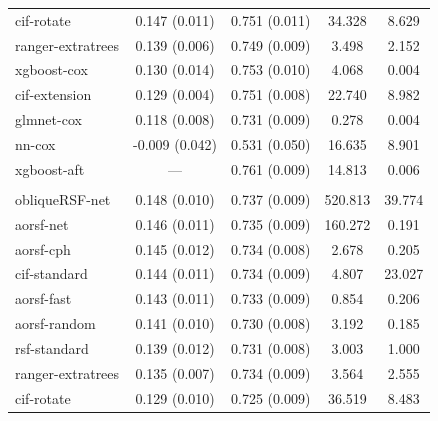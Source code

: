 \documentclass{article}\usepackage[]{graphicx}\usepackage[]{xcolor}
\newenvironment{knitrout}{}{} %
\begin{document}
\begin{knitrout}
\begin{longtable}[t]{lcccc}
\hspace{1em}cif-rotate & 0.147 (0.011) & 0.751 (0.011) & 34.328 & 8.629\\
\hspace{1em}ranger-extratrees & 0.139 (0.006) & 0.749 (0.009) & 3.498 & 2.152\\
\hspace{1em}xgboost-cox & 0.130 (0.014) & 0.753 (0.010) & 4.068 & 0.004\\
\hspace{1em}cif-extension & 0.129 (0.004) & 0.751 (0.008) & 22.740 & 8.982\\
\hspace{1em}glmnet-cox & 0.118 (0.008) & 0.731 (0.009) & 0.278 & 0.004\\
\hspace{1em}nn-cox & -0.009 (0.042) & 0.531 (0.050) & 16.635 & 8.901\\
\hspace{1em}xgboost-aft & --- & 0.761 (0.009) & 14.813 & 0.006\\
\addlinespace[0.3em]
\multicolumn{5}{l}{\textit{\textbf{Rotterdam tumor bank; recurrence, n = 2982, p = 11}}}\\
\hline
\hspace{1em}obliqueRSF-net & 0.148 (0.010) & 0.737 (0.009) & 520.813 & 39.774\\
\hspace{1em}aorsf-net & 0.146 (0.011) & 0.735 (0.009) & 160.272 & 0.191\\
\hspace{1em}aorsf-cph & 0.145 (0.012) & 0.734 (0.008) & 2.678 & 0.205\\
\hspace{1em}cif-standard & 0.144 (0.011) & 0.734 (0.009) & 4.807 & 23.027\\
\hspace{1em}aorsf-fast & 0.143 (0.011) & 0.733 (0.009) & 0.854 & 0.206\\
\hspace{1em}aorsf-random & 0.141 (0.010) & 0.730 (0.008) & 3.192 & 0.185\\
\hspace{1em}rsf-standard & 0.139 (0.012) & 0.731 (0.008) & 3.003 & 1.000\\
\hspace{1em}ranger-extratrees & 0.135 (0.007) & 0.734 (0.009) & 3.564 & 2.555\\
\hspace{1em}cif-rotate & 0.129 (0.010) & 0.725 (0.009) & 36.519 & 8.483\\

\end{longtable}
\end{knitrout}
\end{document}

